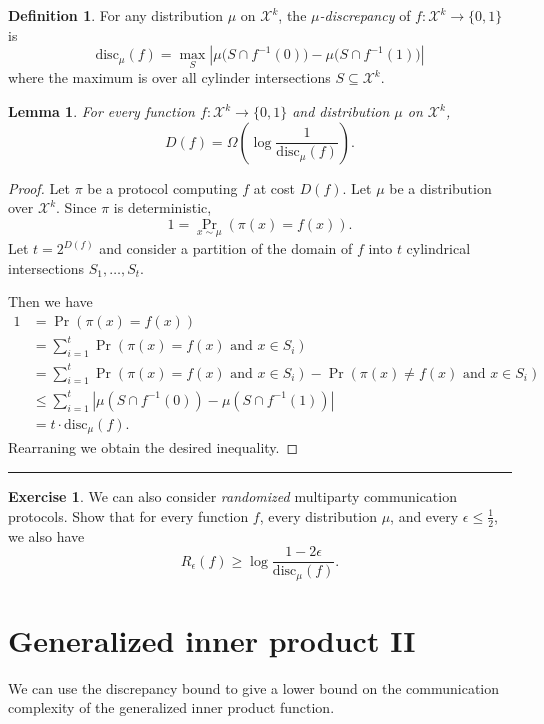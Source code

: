 \documentclass[11pt]{amsart}
\theoremstyle{plain}
\newtheorem{lemma}{Lemma}
\theoremstyle{definition}
\newtheorem{definition}{Definition}
\newtheorem{exercise}{Exercise}
\theoremstyle{plain}
\newcommand{\calX}{\mathcal{X}}
\newcommand{\disc}{\mathrm{disc}}
\newcommand{\exercises}{\bigskip \noindent\rule{8cm}{0.4pt} \medskip}
\begin{document}
\begin{definition}
For any distribution $\mu$ on $\calX^k$, 
the \emph{$\mu$-discrepancy} of $f : \calX^k \to \{0,1\}$ is
\[
\disc_\mu(f) = \max_{S} 
\left| \mu\big( S \cap f^{-1}(0) \big) - \mu\big( S \cap f^{-1}(1)\big) \right|
\]
where the maximum is over all cylinder intersections $S \subseteq \calX^k$.
\end{definition}


\begin{lemma}
For every function $f : \calX^k \to \{0,1\}$ and distribution $\mu$ on $\calX^k$,
\[
D(f) = \Omega\left( \log \frac{1}{\disc_\mu(f)}\right).
\]
\end{lemma}

\begin{proof}
Let $\pi$ be a protocol computing $f$ at cost $D(f)$. Let $\mu$ be a distribution over $\calX^k$. Since $\pi$ is deterministic,
$$1 = \Pr_{x\sim \mu}(\pi(x) = f(x)).$$
Let $t = 2^{D(f)}$ and consider a partition of the domain of $f$ into $t$ cylindrical intersections $S_1, \dots, S_t$.

Then we have
\begin{align*}
1 &=\Pr(\pi(x) = f(x))\\
&=\sum_{i=1}^t\Pr(\pi(x) = f(x)\text{ and } x\in S_i) \\
&= \sum_{i=1}^t\Pr(\pi(x) = f(x)\text{ and } x\in S_i) - \Pr(\pi(x) \neq f(x)\text{ and } x\in S_i)\\
&\leq \sum_{i=1}^t|\mu(S\cap f^{-1}(0)) - \mu(S\cap f^{-1}(1))|\\
&= t\cdot \disc{_\mu}(f).
\end{align*}
Rearraning we obtain the desired inequality.
\end{proof}

\exercises

\begin{exercise}
We can also consider \emph{randomized} multiparty communication protocols. Show that for every function $f$, every distribution $\mu$, and every $\epsilon \le \frac12$, we also have
\[
R_\epsilon(f) \ge \log \frac{1-2\epsilon}{\disc_\mu(f)}.
\]
\end{exercise}


\newpage 
\section{Generalized inner product II}

We can use the discrepancy bound to give a lower bound on the communication complexity of the generalized inner product function.
\end{document}
